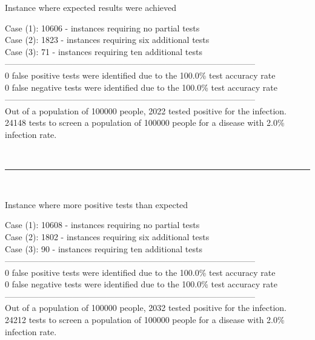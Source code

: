\documentclass[letterpaper, 10pt,DIV=13]{scrartcl}
\numberwithin{equation}{section} %
\numberwithin{figure}{section} %
\numberwithin{table}{section} %
\begin{document}
\begin{displayquote}
\begin{center}
    Instance where expected results were achieved
\end{center}
Case (1): 10606 - instances requiring no partial tests\\
Case (2): 1823 - instances requiring six additional tests\\
Case (3): 71 - instances requiring ten additional tests\\
-----------------------------------------------------------------------------------------\\
0 false positive tests were identified due to the 100.0\% test accuracy rate\\
0 false negative tests were identified due to the 100.0\% test accuracy rate\\
-----------------------------------------------------------------------------------------\\
Out of a population of 100000 people, 2022 tested positive for the infection.\\
24148 tests to screen a population of 100000 people for a disease with 2.0\% infection rate.\\
\end{displayquote}
\\
\begin{center}
\rule{12cm}{.4pt}
\end{center}
\\
\begin{displayquote}
\begin{center}
    Instance where more positive tests than expected
\end{center}
Case (1): 10608 - instances requiring no partial tests\\
Case (2): 1802 - instances requiring six additional tests\\
Case (3): 90 - instances requiring ten additional tests\\
-----------------------------------------------------------------------------------------\\
0 false positive tests were identified due to the 100.0\% test accuracy rate\\
0 false negative tests were identified due to the 100.0\% test accuracy rate\\
-----------------------------------------------------------------------------------------\\
Out of a population of 100000 people, 2032 tested positive for the infection.\\
24212 tests to screen a population of 100000 people for a disease with 2.0\% infection rate.\\
\end{displayquote}
\end{document}
